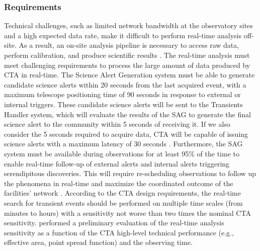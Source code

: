 \subsubsection{Requirements}
\label{ss:sag-requirements}
Technical challenges, such as limited network bandwidth at the observatory sites and a high expected data rate, make it difficult to perform real-time analysis off-site. As a result, an on-site analysis pipeline is necessary to access raw data, perform calibration, and produce scientific results \cite{bulgarelli2015on}. The real-time analysis must meet challenging requirements to process the large amount of data produced by CTA in real-time. The Science Alert Generation system must be able to generate candidate science alerts within 20 seconds from the last acquired event, with a maximum telescope positioning time of 90 seconds in response to external or internal triggers. These candidate science alerts will be sent to the Transients Handler system, which will evaluate the results of the SAG to generate the final science alert to the community within 5 seconds of receiving it. If we also consider the 5 seconds required to acquire data, CTA will be capable of issuing science alerts with a maximum latency of 30 seconds \cite{Bulgarelli_2021}.
Furthermore, the SAG system must be available during observations for at least 95\% of the time to enable real-time follow-up of external alerts and internal alerts triggering serendipitous discoveries. This will require re-scheduling observations to follow up the phenomena in real-time and maximize the coordinated outcome of the facilities' network \cite{di2020detection}. According to the CTA design requirements, the real-time search for transient events should be performed on multiple time scales (from minutes to hours) with a sensitivity not worse than two times the nominal CTA sensitivity. 
\cite{fioretti2015real} performed a preliminary evaluation of the real-time analysis sensitivity as a function of the CTA high-level technical performance (e.g., effective area, point spread function) and the observing time. 
 
